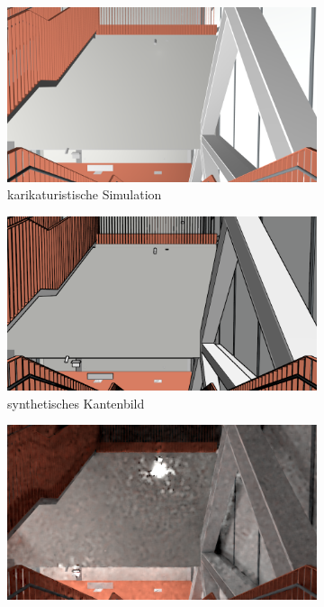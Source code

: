 \vspace{1cm}
\begin{figure}
	\centering
	\begin{subfigure}[t]{0.24\linewidth}
		\centering
		\includegraphics[width=\linewidth]{images/syn_dataset/b00188.png}
		\caption{karikaturistische Simulation}
		\label{subfig:cartoonish}
	\end{subfigure}
	\hfill
	\begin{subfigure}[t]{0.24\linewidth}
		\centering
		\includegraphics[width=\linewidth]{images/syn_dataset/e00188.png}
		\caption{synthetisches \hspace{1cm} Kantenbild}
		\label{subfig:edge}
	\end{subfigure}
	\hfill
	\begin{subfigure}[t]{0.24\linewidth}
		\centering
		\includegraphics[width=\linewidth]{images/syn_dataset/c00188.png}

\end{subfigure}
\end{figure}
